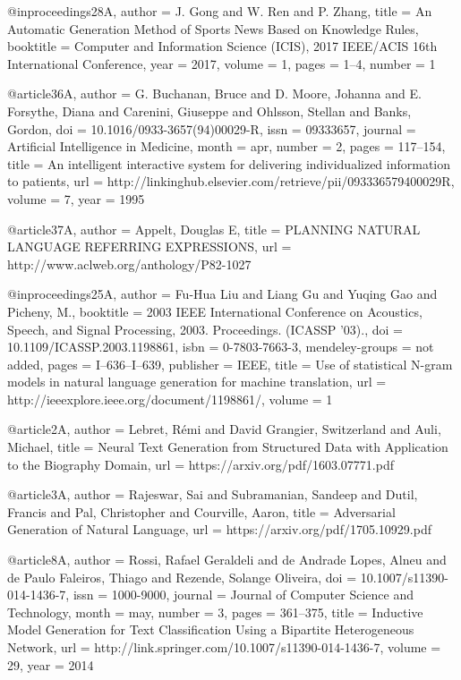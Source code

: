 @inproceedings{28A,
  author = {J. Gong and W. Ren and P. Zhang},
  title = {An Automatic Generation Method of Sports News Based on Knowledge Rules},
  booktitle = {Computer and Information Science (ICIS), 2017 IEEE/ACIS 16th International Conference},
  year = {2017},
  volume = {1},
  pages = {1--4},
  number = {1}
}

@article{36A,
author = {{G. Buchanan}, Bruce and {D. Moore}, Johanna and {E. Forsythe}, Diana and Carenini, Giuseppe and Ohlsson, Stellan and Banks, Gordon},
doi = {10.1016/0933-3657(94)00029-R},
issn = {09333657},
journal = {Artificial Intelligence in Medicine},
month = {apr},
number = {2},
pages = {117--154},
title = {{An intelligent interactive system for delivering individualized information to patients}},
url = {http://linkinghub.elsevier.com/retrieve/pii/093336579400029R},
volume = {7},
year = {1995}
}

@article{37A,
author = {Appelt, Douglas E},
title = {{PLANNING NATURAL LANGUAGE REFERRING EXPRESSIONS}},
url = {http://www.aclweb.org/anthology/P82-1027}
}

@inproceedings{25A,
author = {{Fu-Hua Liu} and {Liang Gu} and {Yuqing Gao} and Picheny, M.},
booktitle = {2003 IEEE International Conference on Acoustics, Speech, and Signal Processing, 2003. Proceedings. (ICASSP '03).},
doi = {10.1109/ICASSP.2003.1198861},
isbn = {0-7803-7663-3},
mendeley-groups = {not added},
pages = {I--636--I--639},
publisher = {IEEE},
title = {{Use of statistical N-gram models in natural language generation for machine translation}},
url = {http://ieeexplore.ieee.org/document/1198861/},
volume = {1}
}

@article{2A,
author = {Lebret, R{\'{e}}mi and {David Grangier}, Switzerland and Auli, Michael},
title = {{Neural Text Generation from Structured Data with Application to the Biography Domain}},
url = {https://arxiv.org/pdf/1603.07771.pdf}
}

@article{3A,
author = {Rajeswar, Sai and Subramanian, Sandeep and Dutil, Francis and Pal, Christopher and Courville, Aaron},
title = {{Adversarial Generation of Natural Language}},
url = {https://arxiv.org/pdf/1705.10929.pdf}
}

@article{8A,
author = {Rossi, Rafael Geraldeli and {de Andrade Lopes}, Alneu and {de Paulo Faleiros}, Thiago and Rezende, Solange Oliveira},
doi = {10.1007/s11390-014-1436-7},
issn = {1000-9000},
journal = {Journal of Computer Science and Technology},
month = {may},
number = {3},
pages = {361--375},
title = {{Inductive Model Generation for Text Classification Using a Bipartite Heterogeneous Network}},
url = {http://link.springer.com/10.1007/s11390-014-1436-7},
volume = {29},
year = {2014}
}

